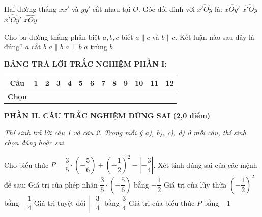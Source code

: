 \documentclass[12pt,a4paper]{article}
\begin{document}
\begin{ex}
Hai đường thẳng $xx'$ và $yy'$ cắt nhau tại $O$. Góc đối đỉnh với $\widehat{x'Oy}$ là:
\choice
{\True $\widehat{xOy'}$}
{$\widehat{x'Oy}$}
{$\widehat{x'Oy'}$}
{$\widehat{xOy}$}
\end{ex}

\begin{ex}
Cho ba đường thẳng phân biệt $a, b, c$ biết $a \parallel c$ và $b \parallel c$. Kết luận nào sau đây là đúng?
\choice
{$a$ cắt $b$}
{\True $a \parallel b$}
{$a \perp b$}
{$a$ trùng $b$}
\end{ex}


\vspace{1mm}
\noindent\textbf{BẢNG TRẢ LỜI TRẮC NGHIỆM PHẦN I:}
\begin{center}
\begin{tabular}{|c|c|c|c|c|c|c|c|c|c|c|c|c|}
\hline
\textbf{Câu} & \textbf{1} & \textbf{2} & \textbf{3} & \textbf{4} & \textbf{5} & \textbf{6} & \textbf{7} & \textbf{8} & \textbf{9} & \textbf{10} & \textbf{11} & \textbf{12} \\
\hline
\textbf{Chọn} & \rule{0pt}{0.48cm} & & & & & & & & & & & \\
\hline
\end{tabular}
\end{center}
\vspace{1mm}

\setcounter{ex}{0}
\noindent\textbf{\large PHẦN II. CÂU TRẮC NGHIỆM ĐÚNG SAI (2,0 điểm)}

\textit{Thí sinh trả lời câu 1 và câu 2. Trong mỗi ý a), b), c), d) ở mỗi câu, thí sinh chọn đúng hoặc sai.}

\vspace{1mm}
\begin{ex}
Cho biểu thức $P = \dfrac{3}{5} \cdot \left(-\dfrac{5}{6}\right) + \left(-\dfrac{1}{2}\right)^2 - \left|-\dfrac{3}{4}\right|$. Xét tính đúng sai của các mệnh đề sau:
\choiceTF
{\True Giá trị của phép nhân $\dfrac{3}{5} \cdot \left(-\dfrac{5}{6}\right)$ bằng $-\dfrac{1}{2}$}
{Giá trị của lũy thừa $\left(-\dfrac{1}{2}\right)^2$ bằng $-\dfrac{1}{4}$}
{\True Giá trị tuyệt đối $\left|-\dfrac{3}{4}\right|$ bằng $\dfrac{3}{4}$}
{\True Giá trị của biểu thức $P$ bằng $-1$}
\end{ex}
\end{document}
